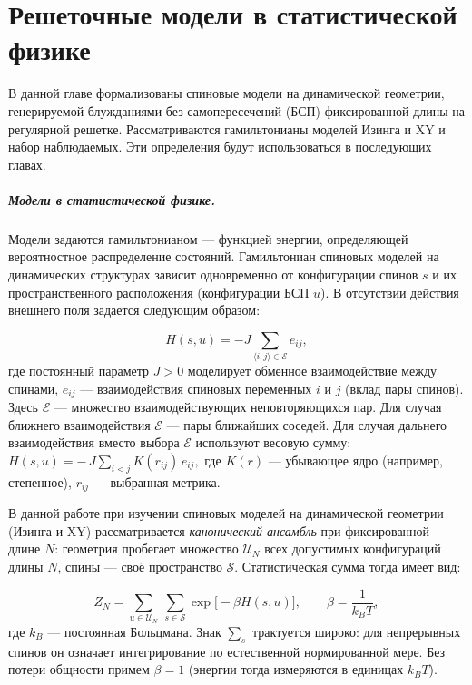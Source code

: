 \chapter{ Решеточные модели в статистической физике }
\label{ch:ch1}
 
В данной главе формализованы спиновые модели на динамической геометрии, генерируемой блужданиями без самопересечений (БСП) фиксированной длины на регулярной решетке. 
Рассматриваются гамильтонианы моделей Изинга и XY и набор наблюдаемых. 
Эти определения будут использоваться в последующих главах.


\paragraph*{Модели в статистической физике.}

 Модели задаются гамильтонианом --- функцией энергии, определяющей вероятностное распределение состояний. 
 Гамильтониан спиновых  моделей на динамических структурах зависит одновременно от конфигурации спинов $s$ и их пространственного расположения  (конфигурации БСП $u$). 
 В отсутствии действия внешнего поля задается следующим образом:
 
 \begin{equation}
 	\label{hamiltonian}
 	  H(s, u) = -J \sum_{ \langle i, j \rangle \in \mathcal E } e_{ij},  %
 \end{equation}
    где постоянный параметр  $J>0$ моделирует обменное взаимодействие между спинами, $ e_{ij}$ ---   взаимодействия спиновых переменных $i $  и $j$ (вклад пары спинов).  
    Здесь $\mathcal E$ — множество взаимодействующих неповторяющихся пар.  
    Для  случая ближнего взаимодействия $\mathcal E$ — пары ближайших соседей. 
    Для случая дальнего взаимодействия  вместо выбора $\mathcal E$ используют весовую сумму:  $ H(s, u) =-\,J\sum_{i<j} K(r_{ij})\,e_{ij},$
    где $K(r)$ --- убывающее ядро (например, степенное), $r_{ij}$ --- выбранная метрика.
    
  
В данной работе при изучении спиновых моделей на динамической геометрии (Изинга и XY) рассматривается  \textit{канонический ансамбль} при фиксированной длине $N$: геометрия пробегает множество $\mathcal U_N$ всех допустимых конфигураций длины $N$, спины --- своё пространство $\mathcal S$. Статистическая сумма тогда имеет вид:

 \begin{equation}
 	\label{Zcanonical}
 	Z_N = \sum_{u\in \mathcal U_N} \ \sum_{s\in \mathcal S} \exp\!\big[-\beta H(s,u)\big], 
 	\qquad \beta=\frac{1}{k_B T},
 \end{equation}
где $k_B$ — постоянная Больцмана. 
Знак $\sum_{s}$ трактуется широко: для непрерывных спинов он означает интегрирование по естественной нормированной мере. 
Без потери общности примем \(\beta=1\) (энергии тогда измеряются в единицах \(k_B T\)).
   
